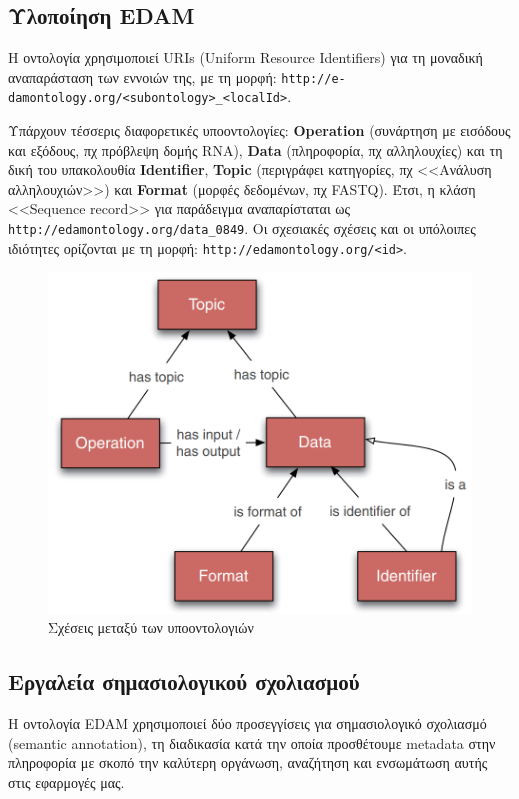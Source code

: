     \subsection{Υλοποίηση EDAM}
        Η οντολογία χρησιμοποιεί URIs (Uniform Resource Identifiers) για τη μοναδική αναπαράσταση των εννοιών της, με τη μορφή: \verb|http://e-damontology.org/<subontology>_<localId>|.

        Υπάρχουν τέσσερις διαφορετικές υποοντολογίες: \textbf{Operation} (συνάρτηση με εισόδους και εξόδους, πχ πρόβλεψη δομής RNA), \textbf{Data} (πληροφορία, πχ αλληλουχίες) και τη δική του υπακολουθία \textbf{Identifier}, \textbf{Topic} (περιγράφει κατηγορίες, πχ <<Ανάλυση αλληλουχιών>>) και \textbf{Format} (μορφές δεδομένων, πχ FASTQ).
        Έτσι, η κλάση <<Sequence record>> για παράδειγμα αναπαρίσταται ως \verb|http://edamontology.org/data_0849|. \linebreak
        Οι σχεσιακές σχέσεις και οι υπόλοιπες ιδιότητες ορίζονται με τη μορφή: \verb|http://edamontology.org/<id>|.

        \begin{figure}[h!] \noindent\centering
            \includegraphics[scale=0.4]{img/Edam subontologies}
            \caption{Σχέσεις μεταξύ των υποοντολογιών \cite{EDAMpaper}}
        \end{figure}

    \subsection{Εργαλεία σημασιολογικού σχολιασμού}
        Η οντολογία EDAM χρησιμοποιεί δύο προσεγγίσεις για σημασιολογικό σχολιασμό (semantic annotation), τη διαδικασία κατά την οποία προσθέτουμε metadata στην πληροφορία με σκοπό την καλύτερη οργάνωση, αναζήτηση και ενσωμάτωση αυτής στις εφαρμογές μας.

